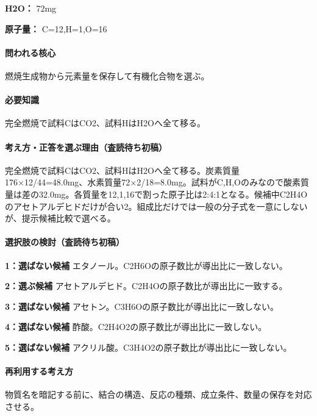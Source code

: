 \noindent\textbf{H2O：} 72mg\par

\noindent\textbf{原子量：} C=\allowbreak{}12,H=\allowbreak{}1,O=\allowbreak{}16\par

\paragraph{問われる核心} 燃焼生成物から元素量を保存して有機化合物を選ぶ。

\paragraph{必要知識} 完全燃焼で試料CはCO2、試料HはH2Oへ全て移る。

\paragraph{考え方・正答を選ぶ理由（査読待ち初稿）} 完全燃焼で試料CはCO2、試料HはH2Oへ全て移る。炭素質量176×12/44=\allowbreak{}48.0mg、水素質量72×2/18=\allowbreak{}8.0mg。試料がC,H,Oのみなので酸素質量は差の32.0mg。各質量を12,1,16で割った原子比は2:4:1となる。候補中C2H4Oのアセトアルデヒドだけが合い2。組成比だけでは一般の分子式を一意にしないが、提示候補比較で選べる。

\paragraph{選択肢の検討（査読待ち初稿）}\mbox{}\par

\noindent\textbf{1：選ばない候補} エタノール。C2H6Oの原子数比が導出比に一致しない。\par

\noindent\textbf{2：選ぶ候補} アセトアルデヒド。C2H4Oの原子数比が導出比に一致する。\par

\noindent\textbf{3：選ばない候補} アセトン。C3H6Oの原子数比が導出比に一致しない。\par

\noindent\textbf{4：選ばない候補} 酢酸。C2H4O2の原子数比が導出比に一致しない。\par

\noindent\textbf{5：選ばない候補} アクリル酸。C3H4O2の原子数比が導出比に一致しない。\par

\paragraph{再利用する考え方} 物質名を暗記する前に、結合の構造、反応の種類、成立条件、数量の保存を対応させる。

